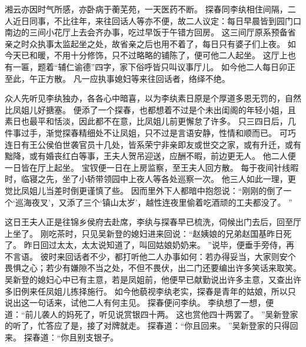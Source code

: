 湘云亦因时气所感，亦卧病于蘅芜苑，一天医药不断。
探春同李纨相住间隔，二人近日同事，不比往年，来往回话人等亦不便，故二人议定：每日早晨皆到园门口南边的三间小花厅上去会齐办事，吃过早饭于午错方回房。
这三间厅原系预备省亲之时众执事太监起坐之处，故省亲之后也用不着了，每日只有婆子们上夜。
如今天已和暖，不用十分修饰，只不过略略的铺陈了，便可他二人起坐。
这厅上也有一匾，题着“辅仁谕德”四字，家下俗呼皆只叫议事厅儿。
如今他二人每日卯正至此，午正方散。
凡一应执事媳妇等来往回话者，络绎不绝。
\par
众人先听见李纨独办，各各心中暗喜，以为李纨素日原是个厚道多恩无罚的，自然比凤姐儿好搪塞。
便添了一个探春，也都想着不过是个未出闺阁的年轻小姐，且素日也最平和恬淡，因此都不在意，比凤姐儿前更懈怠了许多。
只三四日后，几件事过手，渐觉探春精细处不让凤姐，只不过是言语安静，性情和顺而已。
可巧连日有王公侯伯世袭官员十几处，皆系荣宁非亲即友或世交之家，或有升迁，或有黜降，或有婚丧红白等事，王夫人贺吊迎送，应酬不暇，前边更无人。
他二人便一日皆在厅上起坐。
宝钗便一日在上房监察，至王夫人回方散。
每于夜间针线暇时，临寝之先，坐了小轿带领园中上夜人等各处巡察一次。
他三人如此一理，更觉比凤姐儿当差时倒更谨慎了些。
因而里外下人都暗中抱怨说：“刚刚的倒了一个‘巡海夜叉’，又添了三个‘镇山太岁’，越性连夜里偷着吃酒顽的工夫都没了。
”\par
这日王夫人正是往锦乡侯府去赴席，李纨与探春早已梳洗，伺候出门去后，回至厅上坐了。
刚吃茶时，只见吴新登的媳妇进来回说：“赵姨娘的兄弟赵国基昨日死了。
昨日回过太太，太太说知道了，叫回姑娘奶奶来。
”说毕，便垂手旁侍，再不言语。
彼时来回话者不少，都打听他二人办事如何：若办得妥当，大家则安个畏惧之心；若少有嫌隙不当之处，不但不畏伏，出二门还要编出许多笑话来取笑。
吴新登的媳妇心中已有主意，若是凤姐前，他便早已献勤说出许多主意，又查出许多旧例来任凤姐儿拣择施行。
如今他藐视李纨老实，探春是青年的姑娘，所以只说出这一句话来，试他二人有何主见。
探春便问李纨。
李纨想了一想，便道：“前儿袭人的妈死了，听见说赏银四十两。
这也赏他四十两罢了。
”吴新登家的听了，忙答应了是，接了对牌就走。
探春道：“你且回来。
”吴新登家的只得回来。
探春道：“你且别支银子。
